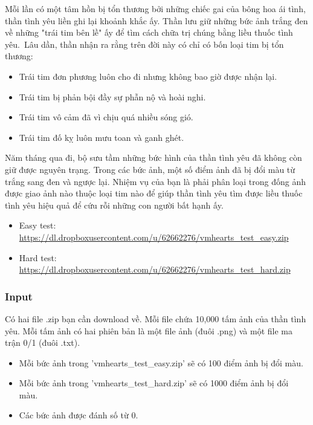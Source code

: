 

Mỗi lần có một tâm hồn bị tổn thương bởi những chiếc gai của bông hoa ái tình, thần tình yêu liền ghi lại khoảnh khắc ấy. Thần lưu giữ những bức ảnh trắng đen về những "trái tim bên lề" ấy để tìm cách chữa trị chúng bằng liều thuốc tình yêu. Lâu dần, thần nhận ra rằng trên đời này có chỉ có bốn loại tim bị tổn thương:
\begin{itemize}
	\item Trái tim đơn phương luôn cho đi nhưng không bao giờ được nhận lại. 
	\item Trái tim bị phản bội đầy sự phẫn nộ và hoài nghi.
	\item Trái tim vô cảm đã vì chịu quá nhiều sóng gió.
	\item Trái tim đố kỵ luôn mưu toan và ganh ghét.  
\end{itemize}

Năm tháng qua đi, bộ sưu tầm những bức hình của thần tình yêu đã không còn giữ được nguyên trạng. Trong các bức ảnh, một số điểm ảnh đã bị đổi màu từ trắng sang đen và ngược lại. Nhiệm vụ của bạn là phải phân loại trong đống ảnh được giao ảnh nào thuộc loại tim nào để giúp thần tình yêu tìm được liều thuốc tình yêu hiệu quả để cứu rỗi những con người bất hạnh ấy. 
\begin{itemize}
	\item Easy test: \href{https://dl.dropboxusercontent.com/u/62662276/vmhearts_test_easy.zip}{https://dl.dropboxusercontent.com/u/62662276/vmhearts\_test\_easy.zip}
	\item Hard test: \href{https://dl.dropboxusercontent.com/u/62662276/vmhearts_test_hard.zip}{https://dl.dropboxusercontent.com/u/62662276/vmhearts\_test\_hard.zip}
\end{itemize}

\subsubsection{Input}

Có hai file .zip bạn cần download về. Mỗi file chứa 10,000 tấm ảnh của thần tình yêu. Mỗi tấm ảnh có hai phiên bản là một file ảnh (đuôi .png) và một file ma trận 0/1 (đuôi .txt).
\begin{itemize}
	\item Mỗi bức ảnh trong 'vmhearts\_test\_easy.zip' sẽ có 100 điểm ảnh bị đổi màu. 
	\item Mỗi bức ảnh trong 'vmhearts\_test\_hard.zip' sẽ có 1000 điểm ảnh bị đổi màu.  
	\item Các bức ảnh được đánh số từ 0. 
\end{itemize}

